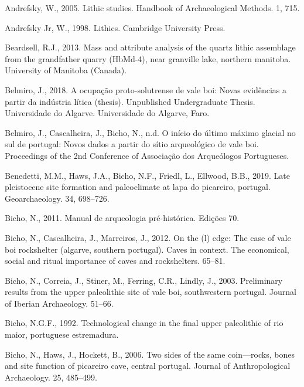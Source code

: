 \documentclass[12pt,twoside]{reedthesis}
\begin{document}
\leavevmode\hypertarget{ref-andrefsky2005}{}%
Andrefsky, W., 2005. Lithic studies. Handbook of Archaeological Methods. 1, 715.

\leavevmode\hypertarget{ref-andrefsky1998}{}%
Andrefsky Jr, W., 1998. Lithics. Cambridge University Press.

\leavevmode\hypertarget{ref-beardsell2013}{}%
Beardsell, R.J., 2013. Mass and attribute analysis of the quartz lithic assemblage from the grandfather quarry (HbMd-4), near granville lake, northern manitoba. University of Manitoba (Canada).

\leavevmode\hypertarget{ref-belmiro2018}{}%
Belmiro, J., 2018. A ocupação proto-solutrense de vale boi: Novas evidências a partir da indústria lítica (thesis). Unpublished Undergraduate Thesis. Universidade do Algarve. Universidade do Algarve, Faro.

\leavevmode\hypertarget{ref-belmiro2017}{}%
Belmiro, J., Cascalheira, J., Bicho, N., n.d. O início do último máximo glacial no sul de portugal: Novos dados a partir do sítio arqueológico de vale boi. Proceedings of the 2nd Conference of Associação dos Arqueólogos Portugueses.

\leavevmode\hypertarget{ref-benedettietal2019}{}%
Benedetti, M.M., Haws, J.A., Bicho, N.F., Friedl, L., Ellwood, B.B., 2019. Late pleistocene site formation and paleoclimate at lapa do picareiro, portugal. Geoarchaeology. 34, 698--726.

\leavevmode\hypertarget{ref-bicho2011}{}%
Bicho, N., 2011. Manual de arqueologia pré-histórica. Edições 70.

\leavevmode\hypertarget{ref-bichoetal2012}{}%
Bicho, N., Cascalheira, J., Marreiros, J., 2012. On the (l) edge: The case of vale boi rockshelter (algarve, southern portugal). Caves in context. The economical, social and ritual importance of caves and rockshelters. 65--81.

\leavevmode\hypertarget{ref-bicho2003}{}%
Bicho, N., Correia, J., Stiner, M., Ferring, C.R., Lindly, J., 2003. Preliminary results from the upper paleolithic site of vale boi, southwestern portugal. Journal of Iberian Archaeology. 51--66.

\leavevmode\hypertarget{ref-bicho1992}{}%
Bicho, N.G.F., 1992. Technological change in the final upper paleolithic of rio maior, portuguese estremadura.

\leavevmode\hypertarget{ref-bicho2006}{}%
Bicho, N., Haws, J., Hockett, B., 2006. Two sides of the same coin---rocks, bones and site function of picareiro cave, central portugal. Journal of Anthropological Archaeology. 25, 485--499.
\end{document}

